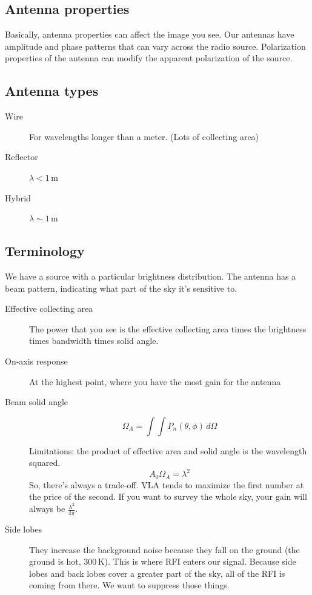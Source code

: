 \documentclass[a4paper]{article}
\begin{document}
\subsection{Antenna properties}

Basically, antenna properties can affect the image you see. Our antennas have amplitude and phase patterns that can vary across the radio source. Polarization properties of the antenna can modify the apparent polarization of the source. 

\subsection{Antenna types}

\begin{description}

\item[Wire] For wavelengths longer than a meter. (Lots of collecting area) 

\item[Reflector] $ \lambda < 1\,$m

\item[Hybrid] $ \lambda \sim 1\,$m

\end{description}

\subsection{Terminology}

We have a source with a particular brightness distribution. The antenna has a beam pattern, indicating what part of the sky it's sensitive to. 

\begin{description}

\item[Effective collecting area] The power that you see is the effective collecting area times the brightness times bandwidth times solid angle. 

\item[On-axis response] At the highest point, where you have the most gain for the antenna

\item[Beam solid angle]

$$ \Omega_A = \int \int P_n(\theta, \phi) \, d\Omega $$

Limitations: the product of effective area and solid angle is the wavelength squared. $$ A_0 \Omega_A = \lambda^2 $$ So, there's always a trade-off. VLA tends to maximize the first number at the price of the second. If you want to survey the whole sky, your gain will always be $ \frac{\lambda^2}{4\pi} $. 

\item[Side lobes] They increase the background noise because they fall on the ground (the ground is hot, $300\,$K). This is where RFI enters our signal. Because side lobes and back lobes cover a greater part of the sky, all of the RFI is coming from there. We want to suppress those things. 

\end{description}
\end{document}
